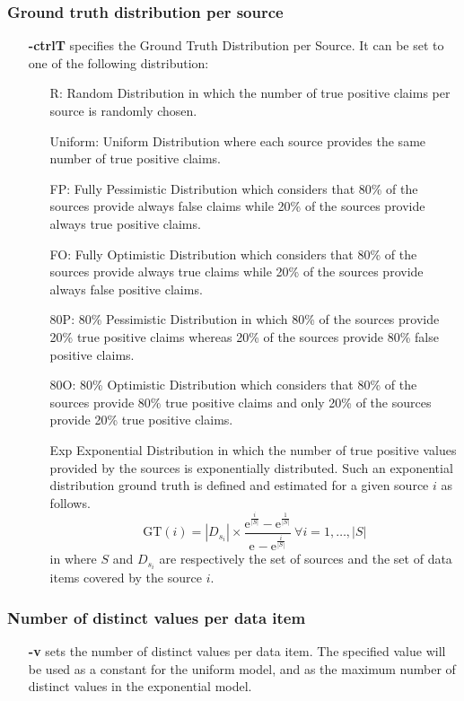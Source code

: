 \documentclass[a4paper,10pt]{scrartcl}
\newcommand{\expo}[1]{\ensuremath{\mathrm{e}^{#1}}}
\newcommand{\gt}[1]{\ensuremath{\mathrm{GT}(#1)}}
\begin{document}
\subsubsection{Ground truth distribution per source}
\begin{itemize}
 \item[\textbf{-ctrlT}] specifies the Ground Truth Distribution per Source. It can be set to one of the following distribution:
 \begin{itemize}
  \item[R:] Random Distribution in which the number of true positive claims per source is randomly chosen.
  \item[Uniform:] Uniform Distribution where each source provides the same number of true positive claims.
  \item[FP:] Fully Pessimistic Distribution which considers that 80\% of the sources provide always false claims
  while 20\% of the sources provide always true positive claims.
  \item[FO:] Fully Optimistic Distribution which considers that 80\% of the sources provide always true claims
  while 20\% of the sources provide always false positive claims.
  \item[80P:] 80\% Pessimistic Distribution in which 80\% of the sources provide 20\% true positive claims whereas
  20\% of the sources provide 80\% false positive claims. 
  \item[80O:] 80\% Optimistic Distribution which considers that 80\% of the sources provide 80\% true positive claims 
  and only 20\% of the sources provide 20\% true positive claims.
  \item[Exp] Exponential Distribution in which the number of true positive values provided by the sources is exponentially
  distributed. Such an exponential distribution ground truth is defined and estimated for a given source $i$ as follows.
  \[
   \gt{i} = |D_{s_i}| \times \frac{\expo{\frac{i}{|S|}} - \expo{\frac{1}{|S|}}}{\expo{} - \expo{\frac{i}{|S|}}}~\forall i= 1, \ldots,|S|
  \]
in where $S$ and $D_{s_i}$ are respectively the set of sources and the set of data items covered by the source $i$.
 \end{itemize}
\end{itemize}
\subsubsection{Number of distinct values per data item}
\begin{itemize}
 \item[\textbf{-v}] sets the number of distinct values per data item. The specified value will be used as a constant for the uniform 
 model, and as the maximum number of distinct values in the exponential model.
\end{itemize}
\end{document}

